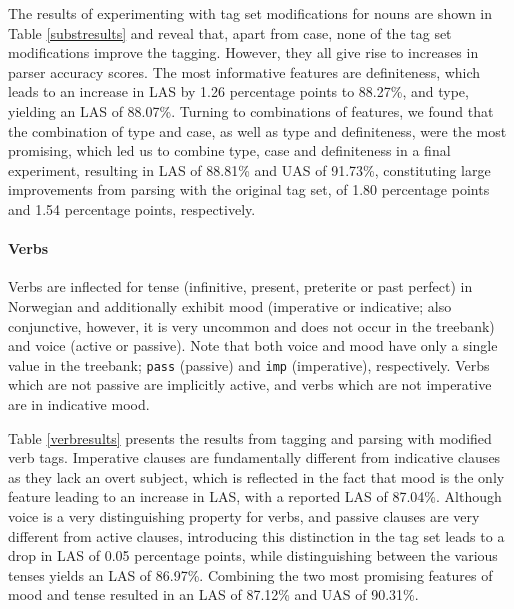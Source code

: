 \documentclass[11pt,a4paper]{article}
\begin{document}
The results of experimenting with tag set modifications
for nouns are shown in Table \ref{substresults} and reveal that, apart from
case, none of the tag set modifications improve the tagging. However, they all
give rise to increases in parser accuracy scores.
The most informative features are definiteness, which
leads to an increase in LAS by 1.26 percentage points to 88.27\%, and type,
yielding an LAS of 88.07\%. Turning to combinations of features, we found that
the combination of type and case, as well as type and definiteness, were the
most promising, which led us to combine type, case and definiteness in a final
experiment, resulting in LAS of 88.81\% and UAS of 91.73\%, constituting large
improvements from parsing with the original tag set, of 1.80 percentage points
and 1.54 percentage points, respectively.

\paragraph{Verbs}
Verbs are inflected for tense (infinitive, present, preterite or past perfect)
in Norwegian and additionally exhibit mood (imperative or indicative; also
conjunctive, however, it is very uncommon and does not occur in the treebank)
and voice (active or passive). Note that both voice and mood have only a single
value in the treebank; \texttt{pass} (passive) and \texttt{imp} (imperative),
respectively. Verbs which are not passive are implicitly active, and verbs
which are not imperative are in indicative mood.

Table \ref{verbresults} presents the results from tagging and parsing with
modified verb tags. Imperative clauses are fundamentally different from
indicative clauses as they lack an overt subject, which is reflected in the
fact that mood is the only feature leading to an increase in LAS, with a
reported LAS of 87.04\%. Although voice is a very distinguishing property for
verbs, and passive clauses are very different from active clauses, introducing
this distinction in the tag set leads to a drop in LAS of 0.05 percentage
points, while distinguishing between the various tenses yields an LAS of
86.97\%. Combining the two most promising features of mood and tense resulted
in an LAS of 87.12\% and UAS of 90.31\%.
\end{document}
